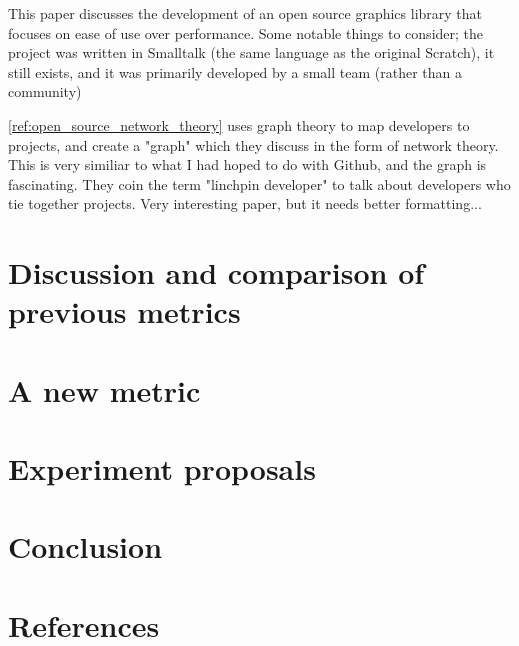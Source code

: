 \documentclass[]{article}
\begin{document}
This paper discusses the development of an open source graphics library that focuses on ease of use over performance.
Some notable things to consider; the project was written in Smalltalk (the same language as the original Scratch), it still exists, and it was primarily developed by a small team (rather than a community)


\ref{ref:open_source_network_theory} uses graph theory to map developers to projects, and create a "graph" which they discuss in the form of network theory.
This is very similiar to what I had hoped to do with Github, and the graph is fascinating.
They coin the term "linchpin developer" to talk about developers who tie together projects.
Very interesting paper, but it needs better formatting...






\section{Discussion and comparison of previous metrics}

\section{A new metric}

\section{Experiment proposals}


\section{Conclusion}
\section{References}
\end{document}
